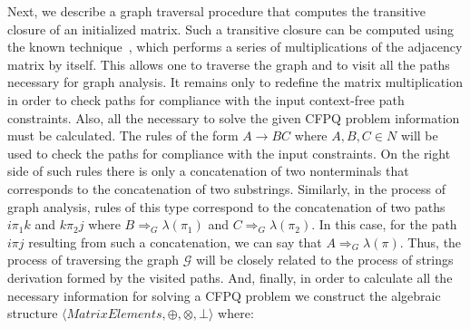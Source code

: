 Next, we describe a graph traversal procedure that computes the transitive closure of an initialized matrix. Such a transitive closure can be computed using the known technique~\cite{baras2010path}, which performs a series of multiplications of the adjacency matrix by itself. This allows one to traverse the graph and to visit all the paths necessary for graph analysis. It remains only to redefine the matrix multiplication in order to check paths for compliance with the input context-free path constraints. Also, all the necessary to solve the given CFPQ problem information must be calculated. The rules of the form $A \rightarrow B C$ where $A, B, C \in N$ will be used to check the paths for compliance with the input constraints. On the right side of such rules there is only a concatenation of two nonterminals that corresponds to the concatenation of two substrings. Similarly, in the process of graph analysis, rules of this type correspond to the concatenation of two paths $i \pi_1 k$ and $k \pi_2 j$ where $B \Rightarrow_G \lambda(\pi_1)$ and $C \Rightarrow_G \lambda(\pi_2)$. In this case, for the path $i \pi j$ resulting from such a concatenation, we can say that $A \Rightarrow_G \lambda(\pi)$. Thus, the process of traversing the graph $\mathcal{G}$ will be closely related to the process of strings derivation formed by the visited paths. And, finally, in order to calculate all the necessary information for solving a CFPQ problem we construct the algebraic structure $\langle \textit{MatrixElements}, \oplus, \otimes, \bot \rangle$ where:
